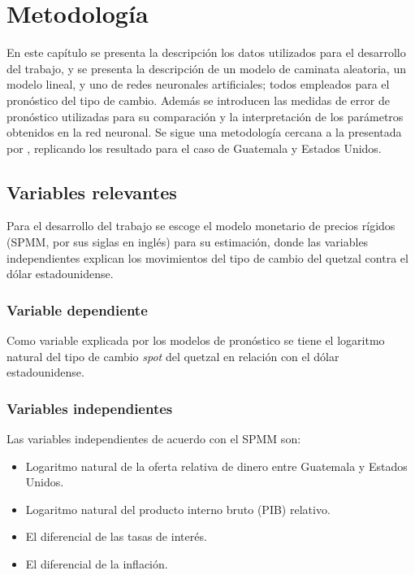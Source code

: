 \section{Metodología}

En este capítulo se presenta la descripción los datos utilizados para el desarrollo del trabajo, y se presenta la descripción de un modelo de caminata aleatoria, un modelo lineal, y uno de redes neuronales artificiales; todos empleados para el pronóstico del tipo de cambio. Además se introducen las medidas de error de pronóstico utilizadas para su comparación y la interpretación de los parámetros obtenidos en la red neuronal. Se sigue una metodología cercana a la presentada por \textcite{sunythesis}, replicando los resultado para el caso de Guatemala y Estados Unidos.

\subsection{Variables relevantes}
Para el desarrollo del trabajo se escoge el modelo monetario de precios rígidos (SPMM, por sus siglas en inglés) para su estimación, donde las variables independientes explican los movimientos del tipo de cambio del quetzal contra el dólar estadounidense.

\subsubsection{Variable dependiente}
Como variable explicada por los modelos de pronóstico se tiene el logaritmo natural del tipo de cambio \textit{spot} del quetzal en relación con el dólar estadounidense.

\subsubsection{Variables independientes}
Las variables independientes de acuerdo con el SPMM son: 

\begin{itemize}
	\item Logaritmo natural de la oferta relativa de dinero entre Guatemala y Estados Unidos.
	\item Logaritmo natural del producto interno bruto (PIB) relativo.
	\item El diferencial de las tasas de interés.
	\item El diferencial de la inflación.
\end{itemize}


